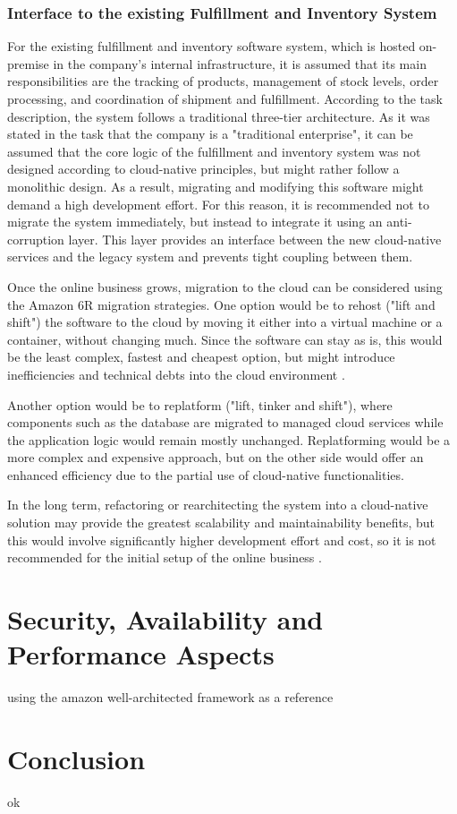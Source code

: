 \documentclass[12pt,a4paper]{article}
\begin{document}
\subsubsection{Interface to the existing Fulfillment and Inventory System}

For the existing fulfillment and inventory software system, which is hosted on-premise in the company's internal infrastructure, it is assumed that its main responsibilities are the tracking of products, management of stock levels, order processing, and coordination of shipment and fulfillment. According to the task description, the system follows a traditional three-tier architecture. As it was stated in the task that the company is a "traditional enterprise", it can be assumed that the core logic of the fulfillment and inventory system was not designed according to cloud-native principles, but might rather follow a monolithic design. As a result, migrating and modifying this software might demand a high development effort. For this reason, it is recommended not to migrate the system immediately, but instead to integrate it using an anti-corruption layer. This layer provides an interface between the new cloud-native services and the legacy system and prevents tight coupling between them.

Once the online business grows, migration to the cloud can be considered using the Amazon 6R migration strategies. One option would be to rehost ("lift and shift") the software to the cloud by moving it either into a virtual machine or a container, without changing much. Since the software can stay as is, this would be the least complex, fastest and cheapest option, but might introduce inefficiencies and technical debts into the cloud environment \cite{amazon_6rs}.

Another option would be to replatform ("lift, tinker and shift"), where components such as the database are migrated to managed cloud services while the application logic would remain mostly unchanged. Replatforming would be a more complex and expensive approach, but on the other side would offer an enhanced efficiency due to the partial use of cloud-native functionalities\cite{amazon_6rs}.

In the long term, refactoring or rearchitecting the system into a cloud-native solution may provide the greatest scalability and maintainability benefits, but this would involve significantly higher development effort and cost, so it is not recommended for the initial setup of the online business \cite{amazon_6rs}.

\section{Security, Availability and Performance Aspects}

using the amazon well-architected framework as a reference

\section{Conclusion}

ok

\printbibliography
\end{document}
